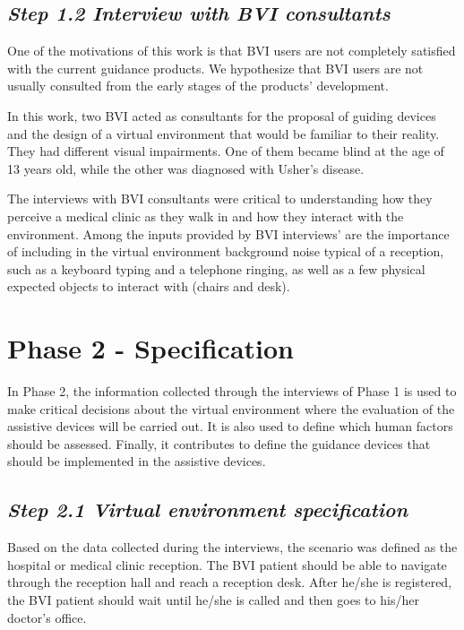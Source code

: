     \subsection*{\textit{Step 1.2 Interview with BVI consultants}}
    
        One of the motivations of this work is that BVI users are not completely satisfied with the current guidance products. We hypothesize that BVI users are not usually consulted from the early stages of the products' development.

        In this work, two BVI acted as consultants for the proposal of guiding devices and the design of a virtual environment that would be familiar to their reality. They had different visual impairments. One of them became blind at the age of 13 years old, while the other was diagnosed with Usher's disease. 

        The interviews with BVI consultants were critical to understanding how they perceive a medical clinic as they walk in and how they interact with the environment. Among the inputs provided by BVI interviews' are the importance of including in the virtual environment background noise typical of a reception, such as a keyboard typing and a telephone ringing, as well as a few physical expected objects to interact with (chairs and desk).
    

\section{Phase 2 - Specification}
\label{sec:idealization_phase}
    In Phase 2, the information collected through the interviews of Phase 1 is used to make critical decisions about the virtual environment where the evaluation of the assistive devices will be carried out. It is also used to define which human factors should be assessed. Finally, it contributes to define the guidance devices that should be implemented in the assistive devices.
    

    \subsection*{\textit{Step 2.1 Virtual environment specification}}
        Based on the data collected during the interviews, the scenario was defined as the hospital or medical clinic reception. The BVI patient should be able to navigate through the reception hall and reach a reception desk. After he/she is registered, the BVI patient should wait until he/she is called and then goes to his/her doctor's office.

